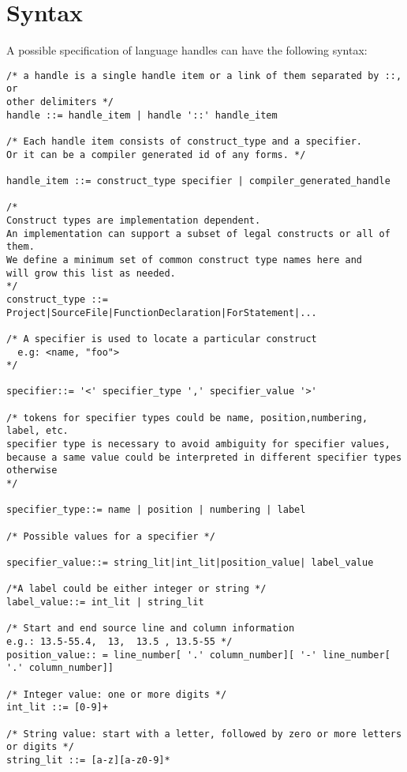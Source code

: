\section{Syntax}
A possible specification of language handles can have the following syntax:

\begin{verbatim}
/* a handle is a single handle item or a link of them separated by ::, or
other delimiters */
handle ::= handle_item | handle '::' handle_item

/* Each handle item consists of construct_type and a specifier. 
Or it can be a compiler generated id of any forms. */

handle_item ::= construct_type specifier | compiler_generated_handle

/* 
Construct types are implementation dependent.
An implementation can support a subset of legal constructs or all of them.
We define a minimum set of common construct type names here and 
will grow this list as needed.
*/
construct_type ::= Project|SourceFile|FunctionDeclaration|ForStatement|...

/* A specifier is used to locate a particular construct
  e.g: <name, "foo">
*/

specifier::= '<' specifier_type ',' specifier_value '>'                

/* tokens for specifier types could be name, position,numbering, label, etc. 
specifier type is necessary to avoid ambiguity for specifier values, 
because a same value could be interpreted in different specifier types otherwise
*/

specifier_type::= name | position | numbering | label 

/* Possible values for a specifier */

specifier_value::= string_lit|int_lit|position_value| label_value

/*A label could be either integer or string */
label_value::= int_lit | string_lit

/* Start and end source line and column information 
e.g.: 13.5-55.4,  13,  13.5 , 13.5-55 */
position_value:: = line_number[ '.' column_number][ '-' line_number[ '.' column_number]]

/* Integer value: one or more digits */
int_lit ::= [0-9]+

/* String value: start with a letter, followed by zero or more letters or digits */
string_lit ::= [a-z][a-z0-9]*

\end{verbatim}

